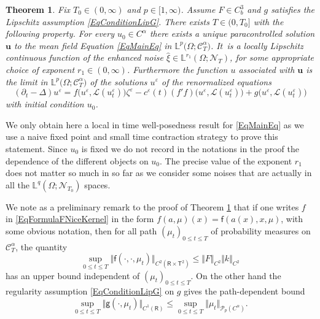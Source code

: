 \documentclass[JEP,XML,SOM,Unicode,published]{cedram}
\newtheorem{thm}{Theorem}
\theoremstyle{definition}
\let\epsilon\varepsilon
\let\eps\epsilon
\newcommand\bbR{\mathbf{\mathsf{R}}}
\newcommand{\mcL}{\mathcal{L}}
\newcommand{\mcN}{\mathcal{N}}
\newcommand{\mcP}{\mathcal{P}}
\newcommand{\bbL}{\mathbb{L}}
\newcommand{\bsu}{\boldsymbol{u}}
\newcommand{\scrC}{\ensuremath{\mathscr{C}}}
\begin{document}
\begin{thm} \label{ThmLongRange2ptfixe}
Fix $T_0\in(0,\infty)$ and $p\in[1,\infty)$. Assume $F\in C^3_b$ and $g$ satisfies the Lipschitz assumption \eqref{EqConditionLipG}. There exists $T\in(0,T_0]$ with the following property. For every $u_0\in C^\alpha$ there exists a unique paracontrolled solution $\bsu$ to the mean field Equation \eqref{EqMainEq} in $\bbL^p(\Omega; \scrC^\alpha_{ T}\bigr)$. It~is a locally Lipschitz continuous function of the enhanced noise $\widehat\xi\in \bbL^{ r_1}(\Omega;\boldsymbol{\mcN}_T)$, for some appropriate choice of exponent $r_1\in(0,\infty)$. Furthermore the function $u$ associated with $\bsu$ is the limit in $\bbL^p\bigl(\Omega; \scrC^\alpha_{ T}\bigr)$ of the solutions $u^\eps$ of the renormalized equations
\[
(\partial_t-\Delta)u^\eps = f\bigl(u^\eps,\mcL(u^\eps_t)\bigr)\zeta^\eps - c^\eps(t) (f'f)\bigl(u^\eps,\mcL(u^\eps_t)\bigr) + g\bigl(u^\eps,\mcL(u^\eps_t)\bigr)
\]
with initial condition $u_0$.
\end{thm}

We only obtain here a local in time well-posedness result for \eqref{EqMainEq} as we use a naive fixed point and small time contraction strategy to prove this statement. Since $u_0$ is fixed we do not record in the notations in the proof the dependence of the different objects on $u_0$. The precise value of the exponent $r_1$ does not matter so much in so far as we consider some noises that are actually in all the $\bbL^q(\Omega; \boldsymbol{\mcN}_{T_0})$ spaces.

We note as a preliminary remark to the proof of Theorem \ref{ThmLongRange2ptfixe} that if one writes $f$ in \eqref{EqFormulaFNiceKernel} in the form $f(a,\mu)(x)=\mathsf{f}(a(x),x,\mu)$, with some obvious notation, then for all path $(\mu_t)_{0\leq t\leq T}$ of probability measures on $ \scrC^\alpha_T$, the quantity
\begin{equation} \label{EqMeasureUniformBoundNonlinearity}
\sup_{0\leq t\leq T} \Vert\mathsf{f}(\cdot,\cdot,\mu_t)\Vert_{C^2(\bbR\times\mathsf{T}^2)} \leq \Vert F\Vert_{C^2} \Vert k\Vert_{C^2}
\end{equation}
has an upper bound independent of $(\mu_t)_{0\leq t\leq T}$. On the other hand the regularity assumption \eqref{EqConditionLipG} on $g$ gives the path-dependent bound
\begin{equation} \label{EqBoundDriftTerm}
\sup_{0\leq t\leq T} \Vert\mathsf{g}(\cdot,\mu_t)\Vert_{C^1(\bbR)} \leq \sup_{0\leq t\leq T} \Vert \mu_t\Vert_{\mcP_p(C^\alpha)}.
\end{equation}
\end{document}
